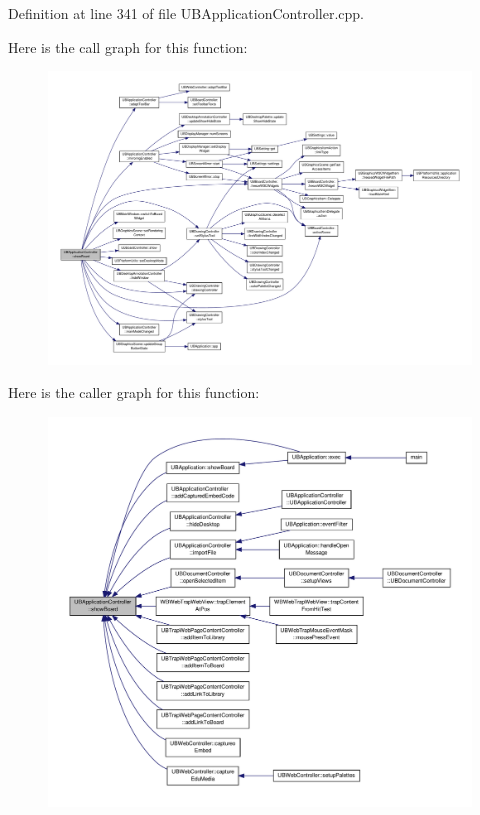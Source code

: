 Definition at line 341 of file U\-B\-Application\-Controller.\-cpp.



Here is the call graph for this function\-:
\nopagebreak
\begin{figure}[H]
\begin{center}
\leavevmode
\includegraphics[width=350pt]{da/d14/class_u_b_application_controller_ae4a1adf81a7b5d4f5d6120699833f0bb_cgraph}
\end{center}
\end{figure}




Here is the caller graph for this function\-:
\nopagebreak
\begin{figure}[H]
\begin{center}
\leavevmode
\includegraphics[width=350pt]{da/d14/class_u_b_application_controller_ae4a1adf81a7b5d4f5d6120699833f0bb_icgraph}
\end{center}
\end{figure}


